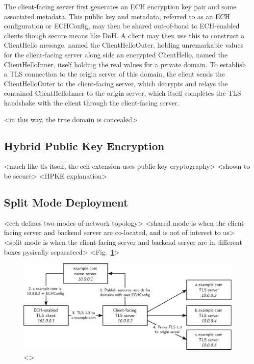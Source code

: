 The client-facing server first generates an ECH encryption key pair and some associated metadata. This public key and metadata, referred to as an ECH configuration or ECHConfig, may then be shared out-of-band to ECH-enabled clients though secure means like DoH. A client may then use this to construct a ClientHello message, named the ClientHelloOuter, holding unremarkable values for the client-facing server along side an encrypted ClientHello, named the ClientHelloInner, itself holding the real values for a private domain. To establish a TLS connection to the origin server of this domain, the client sends the ClientHelloOuter to the client-facing server, which decrypts and relays the contained ClientHelloInner to the origin server, which itself completes the TLS handshake with the client through the client-facing server.

<in this way, the true domain is concealed>

\subsection{Hybrid Public Key Encryption}

<much like tls itself, the ech extension uses public key cryptography>
<shown to be secure>\cite{bhargavan2022symbolic}
<HPKE explanation>

\subsection{Split Mode Deployment}

<ech defines two modes of network topology>
<shared mode is when the client-facing server and backend server are co-located, and is not of interest to us>
<split mode is when the client-facing server and backend server are in different boxes pysically separateed>
<Fig.~\ref{ech_split_mode_figure}>

\begin{figure}[ht]
\centerline{\includegraphics[width=160mm]{images/ech-split-mode.png}}
\caption[Example ECH Split Mode deployment]{<>}
\label{ech_split_mode_figure}
\end{figure}

